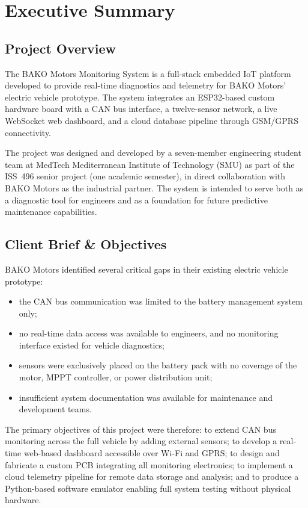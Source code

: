 \section{Executive Summary}

\subsection{Project Overview}

The BAKO Motors Monitoring System is a full-stack embedded IoT platform developed to provide real-time diagnostics and telemetry for BAKO Motors' electric vehicle prototype. The system integrates an ESP32-based custom hardware board with a CAN bus interface, a twelve-sensor network, a live WebSocket web dashboard, and a cloud database pipeline through GSM/GPRS connectivity.

The project was designed and developed by a seven-member engineering student team at MedTech Mediterranean Institute of Technology (SMU) as part of the ISS~496 senior project (one academic semester), in direct collaboration with BAKO Motors as the industrial partner. The system is intended to serve both as a diagnostic tool for engineers and as a foundation for future predictive maintenance capabilities.

\subsection{Client Brief \& Objectives}

BAKO Motors identified several critical gaps in their existing electric vehicle prototype:

\begin{itemize}
    \item the CAN bus communication was limited to the battery management system only;
    \item no real-time data access was available to engineers, and no monitoring interface existed for vehicle diagnostics;
    \item sensors were exclusively placed on the battery pack with no coverage of the motor, MPPT controller, or power distribution unit;
    \item insufficient system documentation was available for maintenance and development teams.
\end{itemize}

The primary objectives of this project were therefore: to extend CAN bus monitoring across the full vehicle by adding external sensors; to develop a real-time web-based dashboard accessible over Wi-Fi and GPRS; to design and fabricate a custom PCB integrating all monitoring electronics; to implement a cloud telemetry pipeline for remote data storage and analysis; and to produce a Python-based software emulator enabling full system testing without physical hardware.

